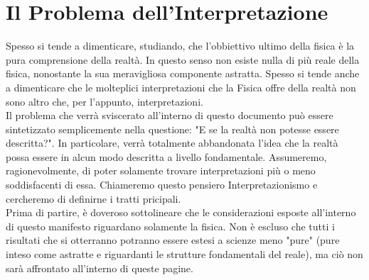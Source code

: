 \documentclass[]{article}
\begin{document}
	\section{Il Problema dell'Interpretazione}
	Spesso si tende a dimenticare, studiando, che l'obbiettivo ultimo della fisica è la pura comprensione della realtà. In questo senso non esiste nulla di più reale della fisica, nonostante la sua meravigliosa componente astratta. Spesso si tende anche a dimenticare che le molteplici interpretazioni che la Fisica offre della realtà non sono altro che, per l'appunto, interpretazioni.  
	\\
	Il problema che verrà sviscerato all'interno di questo documento può essere sintetizzato semplicemente nella questione: "E se la realtà non potesse essere descritta?". In particolare, verrà totalmente abbandonata l'idea che la realtà possa essere in alcun modo descritta a livello fondamentale. Assumeremo, ragionevolmente, di poter solamente trovare interpretazioni più o meno soddisfacenti di essa. Chiameremo questo pensiero Interpretazionismo e cercheremo di definirne i tratti pricipali.\\
		Prima di partire, è doveroso sottolineare che le considerazioni esposte all'interno di questo manifesto riguardano solamente la fisica. Non è escluso che tutti i risultati che si otterranno potranno essere estesi a scienze meno "pure" (pure inteso come astratte e riguardanti le strutture fondamentali del reale), ma ciò non sarà affrontato all'interno di queste pagine. 
\end{document}
